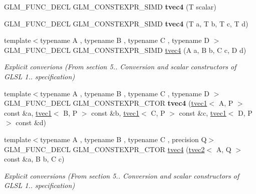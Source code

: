 \begin{DoxyCompactItemize}
G\+L\+M\+\_\+\+F\+U\+N\+C\+\_\+\+D\+E\+CL G\+L\+M\+\_\+\+C\+O\+N\+S\+T\+E\+X\+P\+R\+\_\+\+S\+I\+MD {\bfseries tvec4} (T scalar)
\item 
\mbox{\label{structglm_1_1tvec4_a96d370c6c8e430a96a581c3c31c93091}} 
G\+L\+M\+\_\+\+F\+U\+N\+C\+\_\+\+D\+E\+CL G\+L\+M\+\_\+\+C\+O\+N\+S\+T\+E\+X\+P\+R\+\_\+\+S\+I\+MD {\bfseries tvec4} (T a, T b, T c, T d)
\item 
\mbox{\label{structglm_1_1tvec4_a7beaaa5706db4ba4d8c5eee7f60e66bf}} 
{\footnotesize template$<$typename A , typename B , typename C , typename D $>$ }\\G\+L\+M\+\_\+\+F\+U\+N\+C\+\_\+\+D\+E\+CL G\+L\+M\+\_\+\+C\+O\+N\+S\+T\+E\+X\+P\+R\+\_\+\+S\+I\+MD \hyperlink{structglm_1_1tvec4_a7beaaa5706db4ba4d8c5eee7f60e66bf}{tvec4} (A a, B b, C c, D d)
\begin{DoxyCompactList}\small\item\em Explicit converions (From section 5.. Conversion and scalar constructors of G\+L\+SL 1.. specification) \end{DoxyCompactList}\item 
\mbox{\label{structglm_1_1tvec4_a32b6947cf8247a0a6a94abced04482f6}} 
{\footnotesize template$<$typename A , typename B , typename C , typename D $>$ }\\G\+L\+M\+\_\+\+F\+U\+N\+C\+\_\+\+D\+E\+CL G\+L\+M\+\_\+\+C\+O\+N\+S\+T\+E\+X\+P\+R\+\_\+\+C\+T\+OR {\bfseries tvec4} (\hyperlink{structglm_1_1tvec1}{tvec1}$<$ A, P $>$ const \&a, \hyperlink{structglm_1_1tvec1}{tvec1}$<$ B, P $>$ const \&b, \hyperlink{structglm_1_1tvec1}{tvec1}$<$ C, P $>$ const \&c, \hyperlink{structglm_1_1tvec1}{tvec1}$<$ D, P $>$ const \&d)
\item 
\mbox{\label{structglm_1_1tvec4_a15815171ac69a67c7cc91fc45d67954a}} 
{\footnotesize template$<$typename A , typename B , typename C , precision Q$>$ }\\G\+L\+M\+\_\+\+F\+U\+N\+C\+\_\+\+D\+E\+CL G\+L\+M\+\_\+\+C\+O\+N\+S\+T\+E\+X\+P\+R\+\_\+\+C\+T\+OR \hyperlink{structglm_1_1tvec4_a15815171ac69a67c7cc91fc45d67954a}{tvec4} (\hyperlink{structglm_1_1tvec2}{tvec2}$<$ A, Q $>$ const \&a, B b, C c)
\begin{DoxyCompactList}\small\item\em Explicit conversions (From section 5.. Conversion and scalar constructors of G\+L\+SL 1.. specification) \end{DoxyCompactList}\item 

\end{DoxyCompactItemize}
